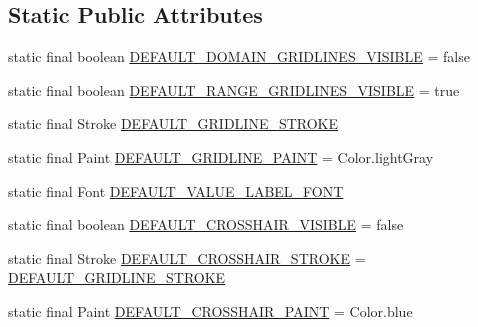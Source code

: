 \subsection*{Static Public Attributes}
\begin{DoxyCompactItemize}
\item 
static final boolean \mbox{\hyperlink{classorg_1_1jfree_1_1chart_1_1plot_1_1_category_plot_acbccfb2c9036b96f4f565af7472c4da7}{D\+E\+F\+A\+U\+L\+T\+\_\+\+D\+O\+M\+A\+I\+N\+\_\+\+G\+R\+I\+D\+L\+I\+N\+E\+S\+\_\+\+V\+I\+S\+I\+B\+LE}} = false
\item 
static final boolean \mbox{\hyperlink{classorg_1_1jfree_1_1chart_1_1plot_1_1_category_plot_a8df2c16e602c1505b2d4cfc8a6df2f50}{D\+E\+F\+A\+U\+L\+T\+\_\+\+R\+A\+N\+G\+E\+\_\+\+G\+R\+I\+D\+L\+I\+N\+E\+S\+\_\+\+V\+I\+S\+I\+B\+LE}} = true
\item 
static final Stroke \mbox{\hyperlink{classorg_1_1jfree_1_1chart_1_1plot_1_1_category_plot_ada3a118a7c9fe7aa6e89d4c94f835799}{D\+E\+F\+A\+U\+L\+T\+\_\+\+G\+R\+I\+D\+L\+I\+N\+E\+\_\+\+S\+T\+R\+O\+KE}}
\item 
static final Paint \mbox{\hyperlink{classorg_1_1jfree_1_1chart_1_1plot_1_1_category_plot_af9cd2023e15a27ebbd5b9109b6d3ec1e}{D\+E\+F\+A\+U\+L\+T\+\_\+\+G\+R\+I\+D\+L\+I\+N\+E\+\_\+\+P\+A\+I\+NT}} = Color.\+light\+Gray
\item 
static final Font \mbox{\hyperlink{classorg_1_1jfree_1_1chart_1_1plot_1_1_category_plot_a21406b37ebdfebfee4121353ecff3c10}{D\+E\+F\+A\+U\+L\+T\+\_\+\+V\+A\+L\+U\+E\+\_\+\+L\+A\+B\+E\+L\+\_\+\+F\+O\+NT}}
\item 
static final boolean \mbox{\hyperlink{classorg_1_1jfree_1_1chart_1_1plot_1_1_category_plot_aa32e140d5a4e1f3e00210b3d186c16ed}{D\+E\+F\+A\+U\+L\+T\+\_\+\+C\+R\+O\+S\+S\+H\+A\+I\+R\+\_\+\+V\+I\+S\+I\+B\+LE}} = false
\item 
static final Stroke \mbox{\hyperlink{classorg_1_1jfree_1_1chart_1_1plot_1_1_category_plot_af50dae0019cec4f4b56627139ad2df0c}{D\+E\+F\+A\+U\+L\+T\+\_\+\+C\+R\+O\+S\+S\+H\+A\+I\+R\+\_\+\+S\+T\+R\+O\+KE}} = \mbox{\hyperlink{classorg_1_1jfree_1_1chart_1_1plot_1_1_category_plot_ada3a118a7c9fe7aa6e89d4c94f835799}{D\+E\+F\+A\+U\+L\+T\+\_\+\+G\+R\+I\+D\+L\+I\+N\+E\+\_\+\+S\+T\+R\+O\+KE}}
\item 
static final Paint \mbox{\hyperlink{classorg_1_1jfree_1_1chart_1_1plot_1_1_category_plot_ac2d374b3734a3d852016b5cacb20a35d}{D\+E\+F\+A\+U\+L\+T\+\_\+\+C\+R\+O\+S\+S\+H\+A\+I\+R\+\_\+\+P\+A\+I\+NT}} = Color.\+blue
\end{DoxyCompactItemize}
